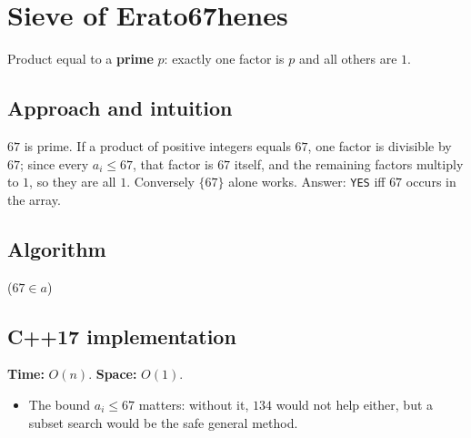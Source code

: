 \section{Sieve of Erato67henes}
\label{sec:n-67}


\begin{patternbox}
Product equal to a \textbf{prime} $p$: exactly one factor is $p$ and all
others are $1$.
\end{patternbox}

\subsection*{Approach and intuition}

$67$ is prime. If a product of positive integers equals $67$, one factor is
divisible by $67$; since every $a_i\le67$, that factor is $67$ itself, and the
remaining factors multiply to $1$, so they are all $1$. Conversely $\{67\}$
alone works. Answer: \texttt{YES} iff $67$ occurs in the array.

\subsection*{Algorithm}
\begin{algorithmic}[1]
\State \Return ($67\in a$)
\end{algorithmic}


\subsection*{C++17 implementation}

\begin{complexitybox}
\textbf{Time:} $O(n)$. \textbf{Space:} $O(1)$.
\end{complexitybox}

\begin{pitfallbox}
\begin{itemize}
  \item The bound $a_i\le67$ matters: without it, $134$ would not help
        either, but a subset search would be the safe general method.
\end{itemize}
\end{pitfallbox}
